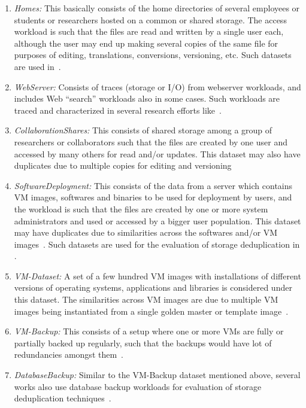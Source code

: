 \begin{enumerate}
 \item \textit{Homes:} This basically consists of the home directories of 
 several employees or students or researchers hosted on a common or 
 shared storage. The access workload is such that the files are read
 and written by a single user each, although the user may end up 
 making several copies of the same file for purposes of editing, 
 translations, conversions, versioning, etc. Such datasets are used
 in~\cite{primary-data-dedup, backup-workloads-characterization, 
 datadomain, cifs-study, redundancy-alternatives}.
 \item \textit{WebServer:} Consists of traces (storage or I/O) from
 webserver workloads, and includes Web ``search'' workloads also in some
 cases. Such workloads are traced and characterized in several research 
 efforts like~\cite{storagecharacterization, filesystem-workloads, 
 content-sampling, my-cache-or-yours, filesize-distrib-cause, 
 web-cable-modem, scaling-phenomena, web-client-access-patterns}.
 \item \textit{CollaborationShares:} This consists of shared storage
 among a group of researchers or collaborators such that the files
 are created by one user and accessed by many others for read and/or
 updates. This dataset may also have duplicates due to multiple 
 copies for editing and versioning~\cite{content-sampling, idedup, 
 cifs-study, redundancy-alternatives}
 \item \textit{SoftwareDeployment:} This consists of the data from 
 a server which contains VM images, softwares and binaries to be 
 used for deployment by users, and the workload is such that the
 files are created by one or more system administrators and used
 or accessed by a bigger user population. This dataset may have duplicates due
 to similarities across the softwares and/or VM images~\cite{similarity}.
 Such datasets are used for the evaluation of storage deduplication
 in \cite{idedup, redundancy-alternatives}.
 \item \textit{VM-Dataset:} A set of a few hundred VM images with
 installations of different versions of operating systems, applications
 and libraries is considered under this dataset. The similarities
 across VM images are due to multiple VM images being instantiated
 from a single golden master or template image~\cite{similarity, dedup-effectiveness, 
 primary-data-dedup, vdn, building-highperf-dedup}.
 \item \textit{VM-Backup:} This consists of a setup where one or more VMs
 are fully or partially backed up regularly, such
 that the backups would have lot of redundancies amongst them~\cite{ddelta, 
 vmdk-backups, hysteresis-rechunking, lowcost-dedup-for-backup}.
 \item \textit{DatabaseBackup:} Similar to the VM-Backup dataset mentioned above,
 several works also use database backup workloads for evaluation
 of storage deduplication techniques~\cite{ddelta, backup-workloads-characterization, 
	 hybrid-dedup, ventana}. 
\end{enumerate}

